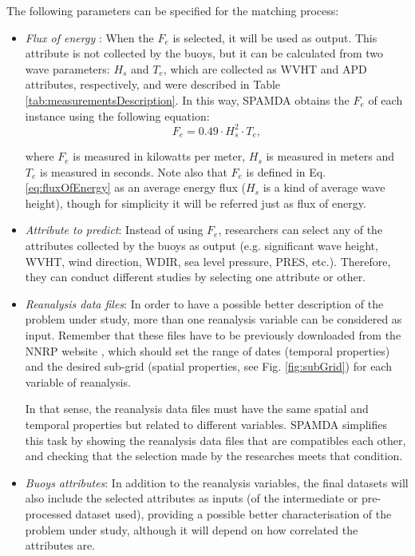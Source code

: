 \documentclass[energies,article,submit,moreauthors,pdftex]{Definitions/mdpi}
\begin{document}
				The following parameters can be specified for the matching process:
				\begin{itemize}
				
					\item \textit{Flux of energy} \cite{FERNANDEZ201544}: When the $F_e$ is selected, it will be used as output. This attribute is not collected by the buoys, but it can be calculated from two wave parameters: $H_s$ and $T_e$, which are collected as WVHT and APD attributes, respectively, and were described in Table \ref{tab:measurementsDescription}. In this way, SPAMDA obtains the $F_e$ of each instance using the following equation:
					\begin{equation}
							F_e = 0.49 \cdot H^2_s \cdot T_e,
							\label{eq:fluxOfEnergy}
					\end{equation}
						
					where $F_e$ is measured in kilowatts per meter, $H_s$ is measured in meters and $T_e$ is measured in seconds. Note also that $F_e$ is defined in Eq. \ref{eq:fluxOfEnergy} as an average energy flux ($H_s$ is a kind of average wave height), though for simplicity it will be referred just as flux of energy.
					
					\item \textit{Attribute to predict}: Instead of using $F_e$, researchers can select any of the attributes collected by the buoys as output (e.g. significant wave height, WVHT, wind direction, WDIR, sea level pressure, PRES, etc.). Therefore, they can conduct different studies by selecting one attribute or other.

					\item \textit{Reanalysis data files}: In order to have a possible better description of the problem under study, more than one reanalysis variable can be considered as input. Remember that these files have to be previously downloaded from the NNRP website \cite{NNRP}, which should set the range of dates (temporal properties) and the desired sub-grid (spatial properties, see Fig. \ref{fig:subGrid}) for each variable of reanalysis.
					
					In that sense, the reanalysis data files must have the same spatial and temporal properties but related to different variables. SPAMDA simplifies this task by showing the reanalysis data files that are compatibles each other, and checking that the selection made by the researches meets that condition.
					
					\item \textit{Buoys attributes}: In addition to the reanalysis variables, the final datasets will also include the selected attributes as inputs (of the intermediate or pre-processed dataset used), providing a possible better characterisation of the problem under study, although it will depend on how correlated the attributes are.


\end{itemize}
\end{document}
